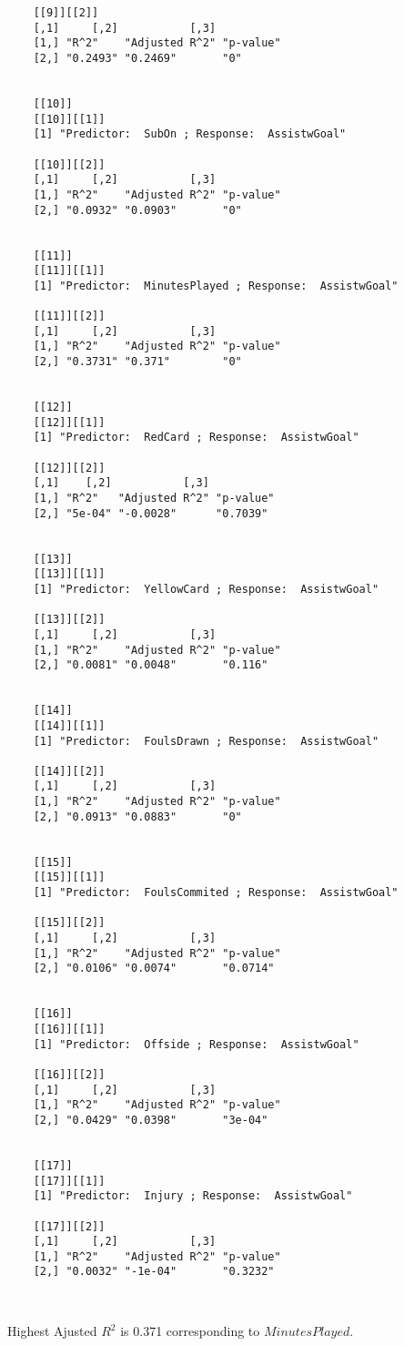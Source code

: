\documentclass[12pt]{article}
\begin{document}
\begin{verbatim}
	[[9]][[2]]
	[,1]     [,2]           [,3]     
	[1,] "R^2"    "Adjusted R^2" "p-value"
	[2,] "0.2493" "0.2469"       "0"      
	
	
	[[10]]
	[[10]][[1]]
	[1] "Predictor:  SubOn ; Response:  AssistwGoal"
	
	[[10]][[2]]
	[,1]     [,2]           [,3]     
	[1,] "R^2"    "Adjusted R^2" "p-value"
	[2,] "0.0932" "0.0903"       "0"      
	
	
	[[11]]
	[[11]][[1]]
	[1] "Predictor:  MinutesPlayed ; Response:  AssistwGoal"
	
	[[11]][[2]]
	[,1]     [,2]           [,3]     
	[1,] "R^2"    "Adjusted R^2" "p-value"
	[2,] "0.3731" "0.371"        "0"      
	
	
	[[12]]
	[[12]][[1]]
	[1] "Predictor:  RedCard ; Response:  AssistwGoal"
	
	[[12]][[2]]
	[,1]    [,2]           [,3]     
	[1,] "R^2"   "Adjusted R^2" "p-value"
	[2,] "5e-04" "-0.0028"      "0.7039" 
	
	
	[[13]]
	[[13]][[1]]
	[1] "Predictor:  YellowCard ; Response:  AssistwGoal"
	
	[[13]][[2]]
	[,1]     [,2]           [,3]     
	[1,] "R^2"    "Adjusted R^2" "p-value"
	[2,] "0.0081" "0.0048"       "0.116"  
	
	
	[[14]]
	[[14]][[1]]
	[1] "Predictor:  FoulsDrawn ; Response:  AssistwGoal"
	
	[[14]][[2]]
	[,1]     [,2]           [,3]     
	[1,] "R^2"    "Adjusted R^2" "p-value"
	[2,] "0.0913" "0.0883"       "0"      
	
	
	[[15]]
	[[15]][[1]]
	[1] "Predictor:  FoulsCommited ; Response:  AssistwGoal"
	
	[[15]][[2]]
	[,1]     [,2]           [,3]     
	[1,] "R^2"    "Adjusted R^2" "p-value"
	[2,] "0.0106" "0.0074"       "0.0714" 
	
	
	[[16]]
	[[16]][[1]]
	[1] "Predictor:  Offside ; Response:  AssistwGoal"
	
	[[16]][[2]]
	[,1]     [,2]           [,3]     
	[1,] "R^2"    "Adjusted R^2" "p-value"
	[2,] "0.0429" "0.0398"       "3e-04"  
	
	
	[[17]]
	[[17]][[1]]
	[1] "Predictor:  Injury ; Response:  AssistwGoal"
	
	[[17]][[2]]
	[,1]     [,2]           [,3]     
	[1,] "R^2"    "Adjusted R^2" "p-value"
	[2,] "0.0032" "-1e-04"       "0.3232" 
	 
		
	\end{verbatim}

Highest Ajusted $ R^2 $ is 0.371 corresponding to $ MinutesPlayed $.
\end{document}
